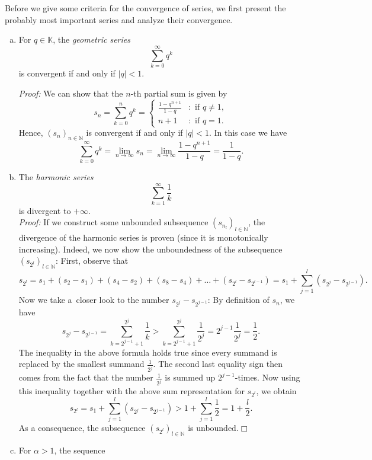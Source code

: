 

Before we give some criteria for the convergence of series, we first present the probably most important series and analyze their convergence.
\begin{example}\label{ex:geomharm}
 \begin{enumerate}[(a)]
  \item For $q\in\mathbb{K}$, the \emph{geometric series}
\[ \sum_{k=0}^\infty q^k\]
is convergent if and only if $|q|<1$.

{\em Proof:} We can show that the $n$-th partial sum is given by
\[s_n=\sum_{k=0}^nq^k=\begin{cases}\frac{1-q^{n+1}}{1-q}&:\text{ if }q\neq1,\\n+1&:\text{ if }q=1.\end{cases}\]
Hence, $(s_n)_{n\in\mathbb{N}}$ is convergent if and only if $|q|<1$. In this case we have
\[ \sum_{k=0}^\infty q^k=\lim_{n\to\infty}s_n=\lim_{n\to\infty}\frac{1-q^{n+1}}{1-q}=\frac{1}{1-q}.\]
\item The \emph{harmonic series}
\[ \sum_{k=1}^\infty \frac1k\]
is divergent to $+\infty$.\\
{\em Proof:} If we construct some unbounded subsequence $(s_{n_l})_{l\in\mathbb{N}}$, the divergence of the harmonic series is proven (since
it is monotonically increasing). 
Indeed, we now show the unboundedness of the subsequence
$(s_{2^l})_{l\in\mathbb{N}}$: First, observe that
\[s_{2^l}=s_1+(s_2-s_1)+(s_4-s_2)+(s_8-s_4)+\ldots+(s_{2^l}-s_{2^{l-1}})=s_1+\sum_{j=1}^l(s_{2^j}-s_{2^{j-1}}).\]
Now we take a~closer look to the number $s_{2^j}-s_{2^{j-1}}$: By definition of $s_n$, we have
\[s_{2^j}-s_{2^{j-1}}=\sum_{k=2^{j-1}+1}^{2^j}\frac1k>\sum_{k=2^{j-1}+1}^{2^j}\frac1{2^{j}}= 2^{j-1}\frac1{2^{j}}=\frac12.\]
The inequality in the above formula holds true since every summand is replaced by the smallest summand $\frac1{2^{j}}$. The second last equality sign then comes from the fact that the number
$\frac1{2^{j}}$ is summed up $2^{j-1}$-times. Now using this inequality together with the above sum representation for $s_{2^l}$, we obtain
\[s_{2^l}=s_1+\sum_{j=1}^l(s_{2^j}-s_{2^{j-1}})>1+\sum_{j=1}^l\frac12=1+\frac{l}2.\]
As a consequence, the subsequence $(s_{2^l})_{l\in\mathbb{N}}$ is unbounded.\hfill$\Box$
\item For $\alpha>1$, the sequence

\end{enumerate}
\end{example}
